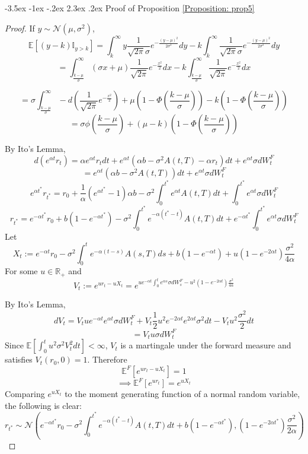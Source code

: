 \documentclass[12pt]{article}
\makeatletter
\renewcommand\section{\@startsection{section}{1}{\z@}%
                                  {-3.5ex \@plus -1ex \@minus -.2ex}%
                                  {2.3ex \@plus.2ex}%
                                  {\normalfont\large\bfseries}}
\theoremstyle{definition}
\theoremstyle{remark}
\makeatother
\begin{document}
\section{Proof of Proposition \ref{Proposition: prop5} }
\begin{proof}


If \(y \sim \mathcal{N}\left(\mu, \sigma^2\right) \), 
\[\mathbb{E}\left[(y-k)\mathbb{I}_{y> k}\right]=\int_k ^\infty y \frac{1}{\sqrt{2\pi}\sigma} e^{-\frac{(y-\mu)^2}{2\sigma^2}} dy -k\int_k ^\infty \frac{1}{\sqrt{2\pi}\sigma} e^{-\frac{(y-\mu)^2}{2\sigma^2}}dy\]
\[=\int_ \frac{k-\mu}{\sigma} ^\infty (\sigma x+\mu) \frac{1}{\sqrt{2\pi}} e^{-\frac{x^2}{2}} dx -k\int_ \frac{k-\mu}{\sigma} ^\infty \frac{1}{\sqrt{2\pi}} e^{-\frac{x^2}{2}} dx\]

\[=\sigma \int_ \frac{k-\mu}{\sigma} ^\infty -d\left(\frac{1}{\sqrt{2\pi}} e^{-\frac{x^2}{2}}\right)+\mu \left(1-\Phi \left( \frac{k-\mu}{\sigma}\right)\right)-k\left(1-\Phi \left( \frac{k-\mu}{\sigma}\right) \right)\]
\[=\sigma \phi\left(\frac{k-\mu}{\sigma}\right)+(\mu-k) \left(1-\Phi \left( \frac{k-\mu}{\sigma}\right)\right)\]

By Ito's Lemma,
\[d \left(e^{\alpha t} r_t\right)=\alpha e^{\alpha t}r_t dt + e^{\alpha t} \left(\alpha b-\sigma^2 A(t, T)-\alpha r_t \right) dt +e^{\alpha t} \sigma dW^F_t \]
\[=e^{\alpha t} \left(\alpha b-\sigma^2 A(t, T)\right) dt +e^{\alpha t} \sigma dW^F_t \]
\[e^{\alpha {t^*}} r_{{t^*}}= r_0 + \frac{1}{\alpha}\left(e^{\alpha {t^*}} -1\right) \alpha b-\sigma^2 \int _0^{{t^*}} e^{\alpha t}A(t, T) dt +\int _ 0 ^ {{t^*}} e^{\alpha t} \sigma dW^F_t \]
\[r_{{t^*}} = e^{-\alpha {t^*}} r_0+ b \left(1-e^{-\alpha {t^*}}\right)-\sigma^2 \int _0^{{t^*}} e^{-\alpha ({t^*}-t)}A(t, T) dt+e^{-\alpha {t^*}} \int _ 0 ^ {{t^*}} e^{\alpha t} \sigma dW^F_t \]
Let 
\[X_t :=e^{-\alpha t} r_0-\sigma^2 \int _0^t e^{-\alpha (t-s)}A(s, T) ds+ b \left(1-e^{-\alpha t}\right)+  u\left(1 -e^{-2\alpha t}\right)\frac{\sigma^2}{4\alpha} \]
For some \(u\in \mathbb{R}_+\) and 
\[V_t:=e^{ur_t -uX_t}=e^{ue^{-\alpha t} \int _ 0 ^ t e^{\alpha s} \sigma dW^F_s -u^2\left(1 -e^{-2\alpha t}\right)\frac{\sigma^2}{4\alpha}}\]  

By Ito's Lemma, 
\[d V_t= V_t ue^{-\alpha t} e^{\alpha t} \sigma dW^F _t +V_t \frac{1}{2} u^2 e^{-2\alpha t} e^{2 \alpha t} \sigma ^2 dt -V_t u^2 \frac{\sigma^2}{2} dt\]
\[=V_tu\sigma dW^F_t \]
Since \(\mathbb{E}\left[\int_0 ^t u^2\sigma^2 V_t ^2 dt \right] < \infty\), \(V_t\) is a martingale under the forward measure and satisfies \(V_t (r_0, 0)=1\).  Therefore 
\[\mathbb{E}^F[e^{ur_t -uX_t}]=1\]
\[\implies \mathbb{E}^F [e^{ur_t}]=e^{uX_t}\]
Comparing \(e^{uX_t}\) to the moment generating function of a normal random variable, the following is clear:
\[r_{t^*} \sim \mathcal{N} \left(e^{-\alpha {t^*}} r_0-\sigma^2 \int _0^{{t^*}} e^{-\alpha ({t^*}-t)}A(t, T) dt+ b \left(1-e^{-\alpha {t^*}}\right), \left(1 -e^{-2\alpha {t^*}}\right)\frac{\sigma^2}{2\alpha} \right) \]


\end{proof}
\end{document}

